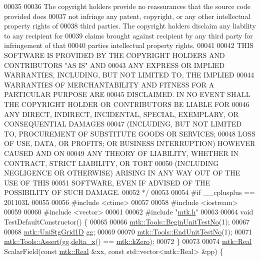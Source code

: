 \begin{DoxyCode}
00035 \textcolor{comment}{}
00036 \textcolor{comment}{The copyright holders provide no reassurances that the source code provided does}
00037 \textcolor{comment}{not infringe any patent, copyright, or any other intellectual property rights of}
00038 \textcolor{comment}{third parties. The copyright holders disclaim any liability to any recipient for}
00039 \textcolor{comment}{claims brought against recipient by any third party for infringement of that}
00040 \textcolor{comment}{parties intellectual property rights.}
00041 \textcolor{comment}{}
00042 \textcolor{comment}{THIS SOFTWARE IS PROVIDED BY THE COPYRIGHT HOLDERS AND CONTRIBUTORS "AS IS" AND}
00043 \textcolor{comment}{ANY EXPRESS OR IMPLIED WARRANTIES, INCLUDING, BUT NOT LIMITED TO, THE IMPLIED}
00044 \textcolor{comment}{WARRANTIES OF MERCHANTABILITY AND FITNESS FOR A PARTICULAR PURPOSE ARE}
00045 \textcolor{comment}{DISCLAIMED. IN NO EVENT SHALL THE COPYRIGHT HOLDER OR CONTRIBUTORS BE LIABLE FOR}
00046 \textcolor{comment}{ANY DIRECT, INDIRECT, INCIDENTAL, SPECIAL, EXEMPLARY, OR CONSEQUENTIAL DAMAGES}
00047 \textcolor{comment}{(INCLUDING, BUT NOT LIMITED TO, PROCUREMENT OF SUBSTITUTE GOODS OR SERVICES;}
00048 \textcolor{comment}{LOSS OF USE, DATA, OR PROFITS; OR BUSINESS INTERRUPTION) HOWEVER CAUSED AND ON}
00049 \textcolor{comment}{ANY THEORY OF LIABILITY, WHETHER IN CONTRACT, STRICT LIABILITY, OR TORT}
00050 \textcolor{comment}{(INCLUDING NEGLIGENCE OR OTHERWISE) ARISING IN ANY WAY OUT OF THE USE OF THIS}
00051 \textcolor{comment}{SOFTWARE, EVEN IF ADVISED OF THE POSSIBILITY OF SUCH DAMAGE.}
00052 \textcolor{comment}{*/}
00053 
00054 \textcolor{preprocessor}{#if \_\_cplusplus == 201103L}
00055 
00056 \textcolor{preprocessor}{#include <ctime>}
00057 
00058 \textcolor{preprocessor}{#include <iostream>}
00059 
00060 \textcolor{preprocessor}{#include <vector>}
00061 
00062 \textcolor{preprocessor}{#include "\hyperlink{mtk_8h}{mtk.h}"}
00063 
00064 \textcolor{keywordtype}{void} TestDefaultConstructor() \{
00065 
00066   \hyperlink{classmtk_1_1Tools_afc29ecaf337a13ed2e817d3890a5a441}{mtk::Tools::BeginUnitTestNo}(1);
00067 
00068   \hyperlink{classmtk_1_1UniStgGrid1D}{mtk::UniStgGrid1D} gg;
00069 
00070   \hyperlink{classmtk_1_1Tools_aba67d9dc35c9c1c49430fcc9ea035e03}{mtk::Tools::EndUnitTestNo}(1);
00071   \hyperlink{classmtk_1_1Tools_ac6804df469c94ab6a796fb64f1e44a89}{mtk::Tools::Assert}(gg.\hyperlink{classmtk_1_1UniStgGrid1D_a6e7173b01241632cf509496d66b9f74c}{delta\_x}() == \hyperlink{group__c01-roots_ga59a451a5fae30d59649bcda274fea271}{mtk::kZero});
00072 \}
00073 
00074 \hyperlink{group__c01-roots_gac080bbbf5cbb5502c9f00405f894857d}{mtk::Real} ScalarField(\textcolor{keyword}{const} \hyperlink{group__c01-roots_gac080bbbf5cbb5502c9f00405f894857d}{mtk::Real} &xx, \textcolor{keyword}{const} std::vector<mtk::Real> &pp) \{

\end{DoxyCode}
